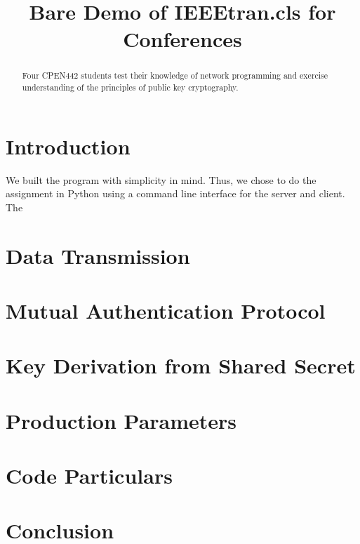 \documentclass[conference]{IEEEtran}
\begin{document}
\title{Bare Demo of IEEEtran.cls for Conferences}


\author{
\and
{}
}


\maketitle

\begin{abstract}
Four CPEN442 students test their knowledge of network programming and exercise understanding of the principles of public key cryptography. 
\end{abstract}



\section{Introduction}
We built the program with simplicity in mind. Thus, we chose to do the assignment in Python using a command line interface for the server and client. The 

\section{Data Transmission}

\section{Mutual Authentication Protocol}
\section{Key Derivation from Shared Secret}
\section{Production Parameters}
\section{Code Particulars}




\section{Conclusion}



\end{document}
